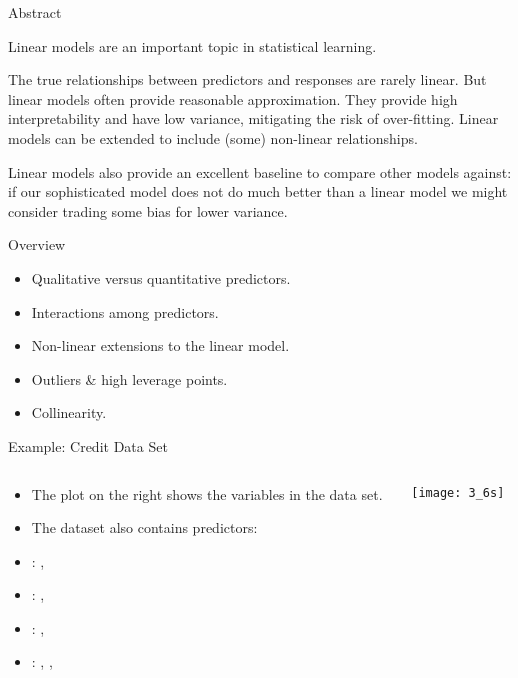 \documentclass[mathserif, aspectratio=169]{beamer}
\subtitle{\bfseries%
  {Linear Regression, Part 3}\\%
  {\tiny\it qualitative predictors, interaction \& non-linear extensions, outliers, collinearity}\\%
}
\begin{document}


\begin{frame}{Abstract}

	\begin{blurb}
		Linear models are an important topic in statistical learning.  

		The true relationships between predictors and responses are rarely linear.
		But linear models often provide reasonable approximation. They provide
		high interpretability and have low variance, mitigating the risk of over-fitting.
		Linear models can be extended to include (some) non-linear relationships. 

		Linear models also provide an excellent baseline to compare other models against: if 
		our sophisticated model does not do much better than a linear model we might consider
		trading some bias for lower variance.
	\end{blurb}
\end{frame}

\begin{frame}{Overview}
	\begin{itemize}
		\item Qualitative versus quantitative predictors.
		\item Interactions among predictors.
		\item Non-linear extensions to the linear model.
		\item Outliers \& high leverage points.
		\item Collinearity.
	\end{itemize}
\end{frame}

\begin{frame}{Example: Credit Data Set}
	\begin{columns}
		\begin{column}{0.5\textwidth}
			\begin{itemize}
				\item The plot on the right shows the  variables
					in the data set.
				\item The dataset also contains  predictors:
				\item[] : , 
				\item[] : , 
				\item[] : , 
				\item[] : , , 
			\end{itemize}
		\end{column}
		\begin{column}{0.5\textwidth}
			\vspace{-10mm}
			\begin{center}
				\texttt{[image: 3\_6s]}
			\end{center}
		\end{column}
	\end{columns}
\end{frame}
\end{document}
